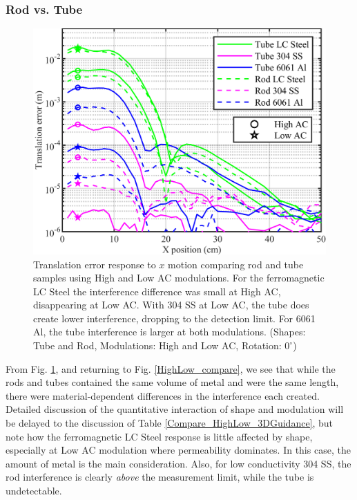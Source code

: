 \documentclass[journal,twoside,web]{ieeecolor}
\begin{document}
\subsubsection{Rod vs. Tube}
\begin{figure}[tb]
\centerline{\includegraphics[width=\columnwidth]{chaic12.png}}
\caption{Translation error response to $x$ motion comparing rod and tube samples using High and Low AC modulations. For the ferromagnetic LC Steel the interference difference was small at High AC, disappearing at Low AC. With 304 SS at Low AC, the tube does create lower interference, dropping to the detection limit. For 6061 Al, the tube interference is larger at both modulations.
(Shapes: Tube and Rod, Modulations: High and Low AC, Rotation: $0^\circ$)}
\label{small_shape}
\end{figure}

From Fig. \ref{small_shape}, and returning to Fig. \ref{HighLow_compare}, we see that while the rods and tubes contained the same volume of metal and were the same length, there were material-dependent differences in the interference each created. Detailed discussion of the quantitative interaction of shape and modulation will be delayed to the discussion of Table \ref{Compare_HighLow_3DGuidance}, but note how the ferromagnetic LC Steel response is little affected by shape, especially at Low AC modulation where permeability dominates. In this case, the amount of metal is the main consideration. Also, for low conductivity 304 SS, the rod interference is clearly \textit{above} the measurement limit, while the tube is undetectable. 
\end{document}
